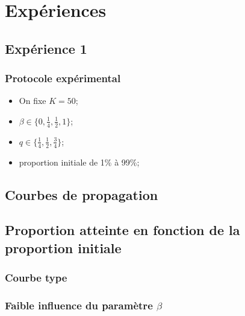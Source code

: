 \documentclass{beamer}
\newcommand{\resultat}[1]{
  \fontsize{8}{10}\selectfont
  \begin{center}
  
  \end{center}
}
\begin{document}
\section{Expériences}
\subsection{Expérience 1}
\begin{frame}
  \frametitle{Protocole expérimental}
  \begin{itemize}
    \item<1->On fixe $K=50$;
    \item<2->$\beta \in \{0,\frac{1}{4},\frac{1}{2},1\}$;
    \item<3->$q\in \{\frac{1}{4}, \frac{1}{2}, \frac{3}{4}\}$;
    \item<4->proportion initiale de 1\% à 99\%;
  \end{itemize}
\end{frame}

\subsection{Courbes de propagation}

\subsection{Proportion atteinte en fonction de la proportion initiale}
\begin{frame}
  \frametitle{Courbe type}
  \resultat{random_finale_f_initiale_q50_Beta50_ec}
\end{frame}

\begin{frame}
  \frametitle{Faible influence du paramètre $\beta$}
   {\resultat{random_finale_f_initiale_q50_Beta0_ec}}
   {\resultat{random_finale_f_initiale_q50_Beta25_ec}}
   {\resultat{random_finale_f_initiale_q50_Beta50_ec}}
   {\resultat{random_finale_f_initiale_q50_Beta75_ec}}
   {\resultat{random_finale_f_initiale_q50_Beta100_ec}}
\end{frame}
\end{document}
